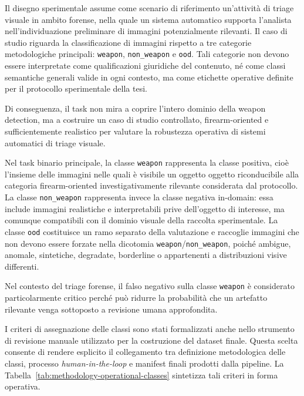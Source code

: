 Il disegno sperimentale assume come scenario di riferimento un'attività di
triage visuale in ambito forense, nella quale un sistema automatico supporta
l'analista nell'individuazione preliminare di immagini potenzialmente
rilevanti. Il caso di studio riguarda la classificazione di immagini rispetto a
tre categorie metodologiche principali: \texttt{weapon}, \texttt{non\_weapon} e
\texttt{ood}. Tali categorie non devono essere interpretate come qualificazioni
giuridiche del contenuto, né come classi semantiche generali valide in ogni
contesto, ma come etichette operative definite per il protocollo sperimentale
della tesi.

Di conseguenza, il task non mira a coprire l'intero dominio della weapon
detection, ma a costruire un caso di studio controllato, firearm-oriented e
sufficientemente realistico per valutare la robustezza operativa di sistemi
automatici di triage visuale.

Nel task binario principale, la classe \texttt{weapon} rappresenta la classe
positiva, cioè l'insieme delle immagini nelle quali è visibile un oggetto
oggetto riconducibile alla categoria firearm-oriented investigativamente
rilevante considerata dal protocollo.
La classe \texttt{non\_weapon} rappresenta invece la classe negativa
in-domain: essa include immagini realistiche e interpretabili prive dell'oggetto
di interesse, ma comunque compatibili con il dominio visuale della raccolta
sperimentale.
La classe \texttt{ood} costituisce un ramo separato della
valutazione e raccoglie immagini che non devono essere forzate nella dicotomia
\texttt{weapon}/\texttt{non\_weapon}, poiché ambigue, anomale, sintetiche,
degradate, borderline o appartenenti a distribuzioni visive differenti.

Nel contesto del triage forense, il falso negativo sulla classe
\texttt{weapon} è considerato particolarmente critico perché può ridurre la
probabilità che un artefatto rilevante venga sottoposto a revisione umana
approfondita.


I criteri di assegnazione delle classi sono stati formalizzati anche nello
strumento di revisione manuale utilizzato per la costruzione del dataset finale.
Questa scelta consente di rendere esplicito il collegamento tra definizione
metodologica delle classi, processo \textit{human-in-the-loop} e manifest finali
prodotti dalla pipeline. La Tabella~\ref{tab:methodology-operational-classes}
sintetizza tali criteri in forma operativa.

